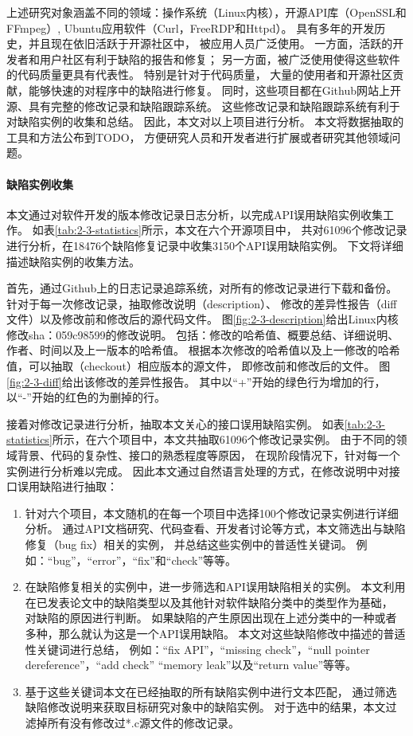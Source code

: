 上述研究对象涵盖不同的领域：操作系统（Linux内核），开源API库（OpenSSL和FFmpeg）,
Ubuntu应用软件（Curl，FreeRDP和Httpd）。
具有多年的开发历史，并且现在依旧活跃于开源社区中，
被应用人员广泛使用。
一方面，活跃的开发者和用户社区有利于缺陷的报告和修复；
另一方面，被广泛使用使得这些软件的代码质量更具有代表性。
特别是针对于代码质量，
大量的使用者和开源社区贡献，能够快速的对程序中的缺陷进行修复。
同时，这些项目都在Github网站上开源、具有完整的修改记录和缺陷跟踪系统。
这些修改记录和缺陷跟踪系统有利于对缺陷实例的收集和总结。
因此，本文对以上项目进行分析。
本文将数据抽取的工具和方法公布到TODO，
方便研究人员和开发者进行扩展或者研究其他领域问题。

\paragraph{缺陷实例收集}



本文通过对软件开发的版本修改记录日志分析，以完成API误用缺陷实例收集工作。
如表\ref{tab:2-3-statistics}所示，本文在六个开源项目中，
共对61096个修改记录进行分析，在18476个缺陷修复记录中收集3150个API误用缺陷实例。
下文将详细描述缺陷实例的收集方法。

首先，通过Github上的日志记录追踪系统，对所有的修改记录进行下载和备份。
针对于每一次修改记录，抽取修改说明（description）、
修改的差异性报告（diff文件）以及修改前和修改后的源代码文件。
图\ref{fig:2-3-description}给出Linux内核修改sha：059c98599的修改说明。
包括：修改的哈希值、概要总结、详细说明、作者、时间以及上一版本的哈希值。
根据本次修改的哈希值以及上一修改的哈希值，可以抽取（checkout）相应版本的源文件，
即修改前和修改后的文件。
图\ref{fig:2-3-diff}给出该修改的差异性报告。
其中以“+”开始的绿色行为增加的行，以“-”开始的红色的为删掉的行。




接着对修改记录进行分析，抽取本文关心的接口误用缺陷实例。
如表\ref{tab:2-3-statistics}所示，在六个项目中，本文共抽取61096个修改记录实例。
由于不同的领域背景、代码的复杂性、接口的熟悉程度等原因，
在现阶段情况下，针对每一个实例进行分析难以完成。
因此本文通过自然语言处理的方式，在修改说明中对接口误用缺陷进行抽取：
\begin{enumerate}
	\item 针对六个项目，本文随机的在每一个项目中选择100个修改记录实例进行详细分析。
	通过API文档研究、代码查看、开发者讨论等方式，本文筛选出与缺陷修复（bug fix）相关的实例，
	并总结这些实例中的普适性关键词。
	例如：“bug”，“error”，“fix”和“check”等等。
	\item 在缺陷修复相关的实例中，进一步筛选和API误用缺陷相关的实例。
	本文利用在已发表论文中的缺陷类型以及其他针对软件缺陷分类中的类型作为基础，
	对缺陷的原因进行判断。
	如果缺陷的产生原因出现在上述分类中的一种或者多种，那么就认为这是一个API误用缺陷。
	本文对这些缺陷修改中描述的普适性关键词进行总结，
	例如：“fix API”，“missing check”，“null pointer dereference”，“add check” “memory leak”以及“return value”等等。
	\item 基于这些关键词本文在已经抽取的所有缺陷实例中进行文本匹配，
	通过筛选缺陷修改说明来获取目标研究对象中的缺陷实例。
	对于选中的结果，本文过滤掉所有没有修改过*.c源文件的修改记录。
\end{enumerate}

